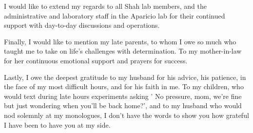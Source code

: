 I would like to extend my regards to all Shah lab members, and the administrative and laboratory staff in the Aparicio lab for their continued support with day-to-day discussions and operations.

Finally, I would like to mention my late parents, to whom I owe so much who taught me to take on life's challenges with determination. To my mother-in-law for her continuous emotional support and prayers for success. 

Lastly, I owe the deepest gratitude to my husband for his advice, his patience, in the face of my most difficult hours, and for his faith in me. To my children, who would text during late hours experiments asking  ' No pressure, mom, we're fine but just wondering when you'll be back home?', and to my husband who would nod solemnly at my monologues, I don't have the words to show you how grateful I have been to have you at my side.